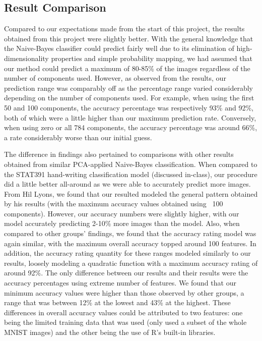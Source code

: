 \documentclass[twocolumn]{article}
\begin{document}
\subsection{Result Comparison}
\label{subsec:comparison}

Compared to our expectations made from the start of this project, the results obtained from this project were slightly better. With the general knowledge that the Naive-Bayes classifier could predict fairly well due to its elimination of high-dimensionality properties and simple probability mapping, we had assumed that our method could predict a maximum of 80-85\% of the images regardless of the number of components used. However, as observed from the results, our prediction range was comparably off as the percentage range varied considerably depending on the number of components used. For example, when using the first 50 and 100 components, the accuracy percentage was respectively 93\% and 92\%, both of which were a little higher than our maximum prediction rate. Conversely, when using zero or all 784 components, the accuracy percentage was around 66\%, a rate considerably worse than our initial guess.

The difference in findings also pertained to comparisons with other results obtained from similar PCA-applied Naive-Bayes classification. When compared to the STAT391 hand-writing classification model (discussed in-class), our procedure did a little better all-around as we were able to accurately predict more images. From Hil Lyons, we found that our resulted modeled the general pattern obtained by his results (with the maximum accuracy values obtained using ~100 components). However, our accuracy numbers were slightly higher, with our model accurately predicting 2-10\% more images than the model. Also, when compared to other groups' findings, we found that the accuracy rating model was again similar, with the maximum overall accuracy topped around 100 features. In addition, the accuracy rating quantity for these ranges modeled similarly to our results, loosely modeling a quadratic function with a maximum accuracy rating of around 92\%. The only difference between our results and their results were the accuracy percentages using extreme number of features. We found that our minimum accuracy values were higher than those observed by other groups, a range that was between 12\% at the lowest and 43\% at the highest. These differences in overall accuracy values could be attributed to two features: one being the limited training data that was used (only used a subset of the whole MNIST images) and the other being the use of R's built-in libraries.
\end{document}
